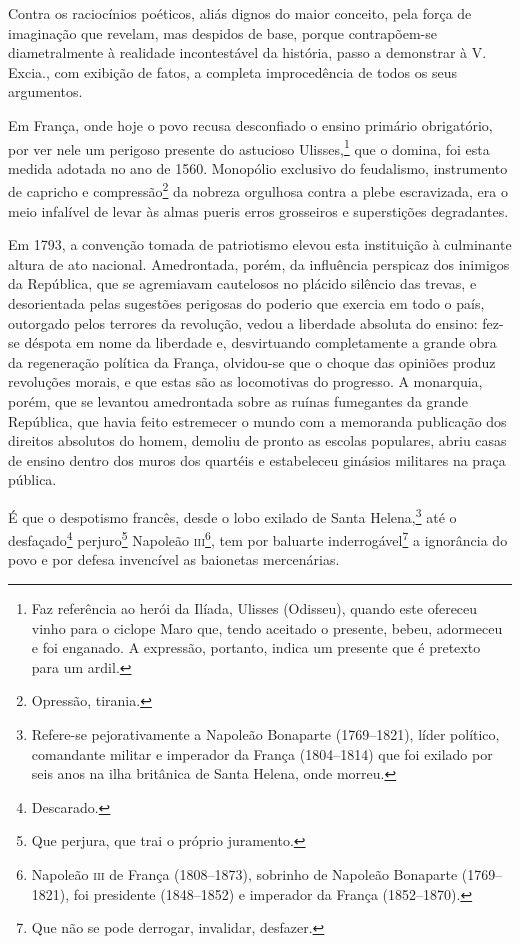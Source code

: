 Contra os raciocínios poéticos, aliás dignos do maior conceito, pela
força de imaginação que revelam, mas despidos de base, porque
contrapõem-se diametralmente à realidade incontestável da história,
passo a demonstrar à V.\,Excia., com exibição de fatos, a completa
improcedência de todos os seus argumentos.

Em França, onde hoje o povo recusa desconfiado o ensino primário
obrigatório, por ver nele um perigoso presente do astucioso
Ulisses,\footnote{Faz referência ao herói da Ilíada, Ulisses (Odisseu),
  quando este ofereceu vinho para o ciclope Maro que, tendo aceitado o
  presente, bebeu, adormeceu e foi enganado. A expressão, portanto,
  indica um presente que é pretexto para um ardil.} que o domina, foi
esta medida adotada no ano de 1560. Monopólio exclusivo do feudalismo,
instrumento de capricho e compressão\footnote{Opressão, tirania.} da
nobreza orgulhosa contra a plebe escravizada, era o meio infalível de
levar às almas pueris erros grosseiros e superstições degradantes.

Em 1793, a convenção tomada de patriotismo elevou esta instituição à
culminante altura de ato nacional. Amedrontada, porém, da influência
perspicaz dos inimigos da República, que se agremiavam cautelosos no
plácido silêncio das trevas, e desorientada pelas sugestões perigosas do
poderio que exercia em todo o país, outorgado pelos terrores da
revolução, vedou a liberdade absoluta do ensino: fez-se déspota em nome
da liberdade e, desvirtuando completamente a grande obra da regeneração
política da França, olvidou-se que o choque das opiniões produz
revoluções morais, e que estas são as locomotivas do progresso. A
monarquia, porém, que se levantou amedrontada sobre as ruínas fumegantes
da grande República, que havia feito estremecer o mundo com a memoranda
publicação dos direitos absolutos do homem, demoliu de pronto as escolas
populares, abriu casas de ensino dentro dos muros dos quartéis e
estabeleceu ginásios militares na praça pública.

É que o despotismo francês, desde o lobo exilado de Santa
Helena,\footnote{Refere-se pejorativamente a Napoleão Bonaparte
  (1769--1821), líder político, comandante militar e imperador da França
  (1804--1814) que foi exilado por seis anos na ilha britânica de Santa
  Helena, onde morreu.} até o desfaçado\footnote{Descarado.}
perjuro\footnote{Que perjura, que trai o próprio juramento.} Napoleão
\textsc{iii}\footnote{Napoleão \textsc{iii} de França (1808--1873), sobrinho de Napoleão
  Bonaparte (1769--1821), foi presidente (1848--1852) e imperador da
  França (1852--1870).}, tem por baluarte inderrogável\footnote{Que não
  se pode derrogar, invalidar, desfazer.} a ignorância do povo e por
defesa invencível as baionetas mercenárias.

